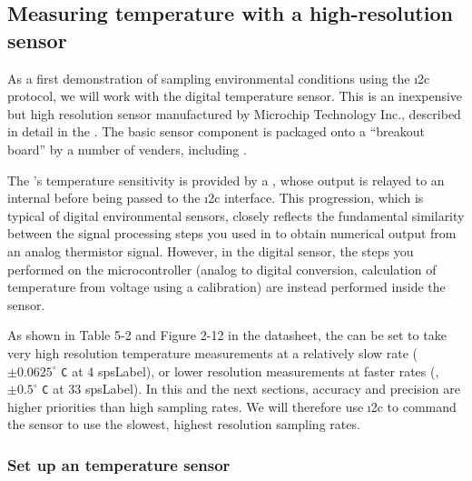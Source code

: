 \subsection{ Measuring temperature with a high-resolution sensor }
As a first demonstration of sampling environmental conditions using the \i2c protocol, we will work with the  digital temperature sensor.
This is an inexpensive but high resolution sensor manufactured by Microchip Technology Inc., described in detail in the .
The basic sensor component is packaged onto a ``breakout board'' by a number of venders, including .

The 's temperature sensitivity is provided by a , whose output is relayed to an internal \adc before being passed to the \i2c interface.
This progression, which is typical of digital environmental sensors, closely reflects the fundamental similarity between the signal processing steps you used in  to obtain numerical output from an analog thermistor signal.
However, in the digital sensor, the steps you performed on the microcontroller (analog to digital conversion, calculation of temperature from voltage using a calibration) are instead performed inside the sensor.

As shown in Table 5-2 and Figure 2-12 in the datasheet, the  can be set to take very high resolution temperature measurements at a relatively slow rate ($\pm 0.0625^\circ$ \texttt{C} at 4 \gls{spsLabel}), or lower resolution measurements at faster rates (\eg,$\pm 0.5 ^\circ$ \texttt{C} at 33 \gls{spsLabel}).
In this and the next sections, accuracy and precision are higher priorities than high sampling rates.
We will therefore use \i2c to command the sensor to use the slowest, highest resolution sampling rates.

\subsubsection{\howto Set up an  temperature sensor}

